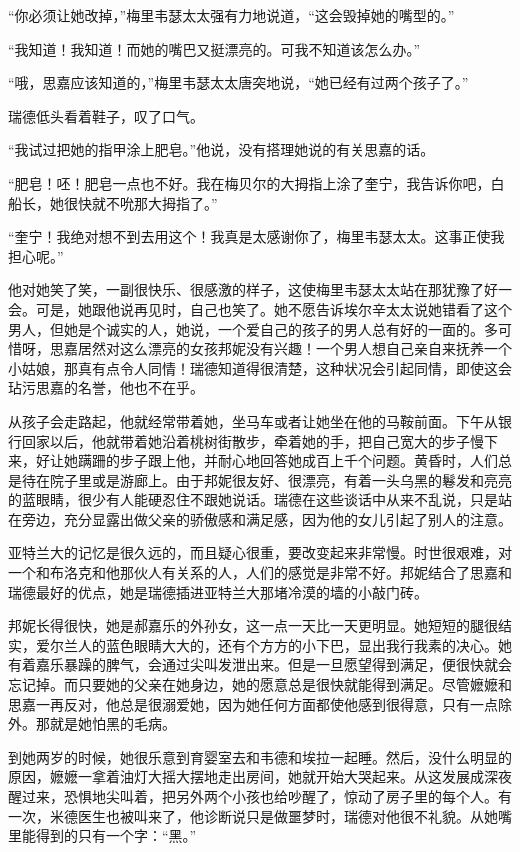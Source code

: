 \par “你必须让她改掉，”梅里韦瑟太太强有力地说道，“这会毁掉她的嘴型的。”
\par “我知道！我知道！而她的嘴巴又挺漂亮的。可我不知道该怎么办。”
\par “哦，思嘉应该知道的，”梅里韦瑟太太唐突地说，“她已经有过两个孩子了。”
\par 瑞德低头看着鞋子，叹了口气。
\par “我试过把她的指甲涂上肥皂。”他说，没有搭理她说的有关思嘉的话。
\par “肥皂！呸！肥皂一点也不好。我在梅贝尔的大拇指上涂了奎宁，我告诉你吧，白船长，她很快就不吮那大拇指了。”
\par “奎宁！我绝对想不到去用这个！我真是太感谢你了，梅里韦瑟太太。这事正使我担心呢。”
\par 他对她笑了笑，一副很快乐、很感激的样子，这使梅里韦瑟太太站在那犹豫了好一会。可是，她跟他说再见时，自己也笑了。她不愿告诉埃尔辛太太说她错看了这个男人，但她是个诚实的人，她说，一个爱自己的孩子的男人总有好的一面的。多可惜呀，思嘉居然对这么漂亮的女孩邦妮没有兴趣！一个男人想自己亲自来抚养一个小姑娘，那真有点令人同情！瑞德知道得很清楚，这种状况会引起同情，即使这会玷污思嘉的名誉，他也不在乎。
\par 从孩子会走路起，他就经常带着她，坐马车或者让她坐在他的马鞍前面。下午从银行回家以后，他就带着她沿着桃树街散步，牵着她的手，把自己宽大的步子慢下来，好让她蹒跚的步子跟上他，并耐心地回答她成百上千个问题。黄昏时，人们总是待在院子里或是游廊上。由于邦妮很友好、很漂亮，有着一头乌黑的鬈发和亮亮的蓝眼睛，很少有人能硬忍住不跟她说话。瑞德在这些谈话中从来不乱说，只是站在旁边，充分显露出做父亲的骄傲感和满足感，因为他的女儿引起了别人的注意。
\par 亚特兰大的记忆是很久远的，而且疑心很重，要改变起来非常慢。时世很艰难，对一个和布洛克和他那伙人有关系的人，人们的感觉是非常不好。邦妮结合了思嘉和瑞德最好的优点，她是瑞德插进亚特兰大那堵冷漠的墙的小敲门砖。
\par 邦妮长得很快，她是郝嘉乐的外孙女，这一点一天比一天更明显。她短短的腿很结实，爱尔兰人的蓝色眼睛大大的，还有个方方的小下巴，显出我行我素的决心。她有着嘉乐暴躁的脾气，会通过尖叫发泄出来。但是一旦愿望得到满足，便很快就会忘记掉。而只要她的父亲在她身边，她的愿意总是很快就能得到满足。尽管嬷嬷和思嘉一再反对，他总是很溺爱她，因为她任何方面都使他感到很得意，只有一点除外。那就是她怕黑的毛病。
\par 到她两岁的时候，她很乐意到育婴室去和韦德和埃拉一起睡。然后，没什么明显的原因，嬷嬷一拿着油灯大摇大摆地走出房间，她就开始大哭起来。从这发展成深夜醒过来，恐惧地尖叫着，把另外两个小孩也给吵醒了，惊动了房子里的每个人。有一次，米德医生也被叫来了，他诊断说只是做噩梦时，瑞德对他很不礼貌。从她嘴里能得到的只有一个字：“黑。”
